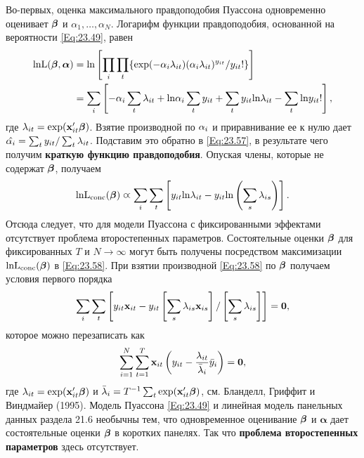 Во-первых, оценка максимального правдоподобия Пуассона одновременно оценивает $\bm{\beta}$ и $\alpha_1, \dots, \alpha_N$. Логарифм функции правдоподобия, основанной на вероятности \ref{Eq:23.49}, равен
\begin{align}
\mathrm{ln L}(\bm{\beta}, \bm\alpha) 
& = \mathrm{ln} 
\left[ \prod_i \prod_t \{\exp (-\alpha_i \lambda_{it}) (\alpha_i \lambda_{it})^{y_{it}} / y_{it} ! \} \right] 
\label{Eq:23.57} \\
& = \sum_i \left[ -\alpha_i \sum_t \lambda_{it} + \mathrm{ln} \alpha_i \sum_t y_{it} + \sum_t y_{it} \mathrm{ln} \lambda_{it} - \sum_t \mathrm{ln} y_{it}! \right], 
\nonumber 
\end{align}
где $\lambda_{it}=\exp (\mathbf{x}'_{it} \bm{\beta})$. Взятие производной по $\alpha_i$ и приравнивание ее к нулю дает $\hat{\alpha_i}=\sum_t y_{it}/ \sum_t \lambda_{it}$. Подставим это обратно в \ref{Eq:23.57}, в результате чего получим \textbf{краткую функцию правдоподобия}. Опуская члены, которые не содержат $\bm{\beta}$, получаем
\begin{align}
\mathrm{ln L}_{\mathrm{conc}}(\bm{\beta}) \varpropto 
\sum_i \sum_t \left[ y_{it} \mathrm{ln} \lambda_{it} - y_{it} \mathrm{ln} \left( \sum_s \lambda_{is} \right) \right].
\label{Eq:23.58}
\end{align}
Отсюда следует, что для модели Пуассона с фиксированными эффектами отсутствует проблема второстепенных параметров. Состоятельные оценки $\bm{\beta}$ для фиксированных $T$ и $N \rightarrow \infty$ могут быть получены посредством максимизации $\mathrm{ln L_{conc}}(\bm{\beta})$ в \ref{Eq:23.58}. При взятии производной \ref{Eq:23.58} по $\bm{\beta}$  получаем условия первого порядка
\begin{align}
\sum_i \sum_t 
\left[ y_{it} \mathbf{x}_{it} - y_{it} \left[ \sum_s \lambda_{is} \mathbf{x}_{is} \right] /
\left[ \sum_s \lambda_{is} \right] \right] = \mathbf{0},
\nonumber
\end{align}
которое можно перезаписать как
\begin{align}
\sum^N_{i=1} \sum^T_{t=1} \mathbf{x}_{it} \left( y_{it} - \frac{\lambda_{it}}{\bar{\lambda}_i}\bar{y}_i \right) = \mathbf{0},
\label{Eq:23.59}
\end{align}
где $\lambda_{it}=\exp (\mathbf{x}'_{it} \bm{\beta})$  и $\bar{\lambda}_i=T^{-1} \sum_t \exp (\mathbf{x}'_{it} \bm{\beta})$, см. Бланделл, Гриффит и Виндмайер (1995). Модель Пуассона \ref{Eq:23.49} и линейная модель панельных данных раздела 21.6 необычны тем, что одновременное оценивание $\bm{\beta}$ и $\bm\alpha$  дает состоятельные оценки $\bm{\beta}$ в коротких панелях. Так что \textbf{проблема второстепенных параметров} здесь отсутствует.


